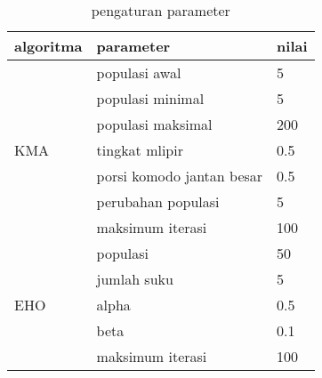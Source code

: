 \begin{table}[h!]
\centering
\caption{pengaturan parameter}
\label{tab:pengaturan-parameter}
\begin{tabular}{|l|l|l|}
\hline
algoritma            & parameter                 & nilai \\ \hline
\multirow[t]{7}{*}{KMA} & populasi awal             & 5     \\ \cline{2-3} 
                     & populasi minimal          & 5     \\ \cline{2-3} 
                     & populasi maksimal         & 200   \\ \cline{2-3} 
                     & tingkat mlipir            & 0.5   \\ \cline{2-3} 
                     & porsi komodo jantan besar & 0.5   \\ \cline{2-3} 
                     & perubahan populasi        & 5     \\ \cline{2-3} 
                     & maksimum iterasi          & 100   \\ \hline
\multirow[t]{5}{*}{EHO} & populasi                  & 50    \\ \cline{2-3} 
                     & jumlah suku               & 5     \\ \cline{2-3} 
                     & alpha                     & 0.5   \\ \cline{2-3} 
                     & beta                      & 0.1   \\ \cline{2-3} 
                     & maksimum iterasi          & 100   \\ \hline
\end{tabular}
\end{table}

